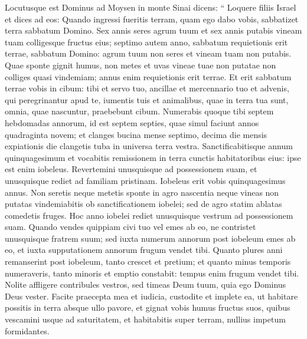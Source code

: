 \begin{biblechapter}
\begin{biblechapter}
\begin{biblechapter}
\begin{biblechapter}
\begin{biblechapter}
\begin{biblechapter}
\begin{biblechapter}
\begin{biblechapter}
\begin{biblechapter}
\begin{biblechapter}
\begin{biblechapter}
\begin{biblechapter}
\begin{biblechapter}
\begin{biblechapter}
\begin{biblechapter}
\begin{biblechapter}
\begin{biblechapter}
\begin{biblechapter}
\begin{biblechapter}
\begin{biblechapter}
\begin{biblechapter}
\begin{biblechapter}
\begin{biblechapter}
\begin{biblechapter}
\begin{biblechapter}
\verse Locutusque est Dominus ad Moysen in monte Sinai dicens: 
\verse “ Loquere filiis Israel et dices ad eos: Quando ingressi fueritis terram, quam ego dabo vobis, sabbatizet terra sabbatum Domino. 
\verse Sex annis seres agrum tuum et sex annis putabis vineam tuam colligesque fructus eius; 
\verse septimo autem anno, sabbatum requietionis erit terrae, sabbatum Domino: agrum tuum non seres et vineam tuam non putabis. 
\verse Quae sponte gignit humus, non metes et uvas vineae tuae non putatae non colliges quasi vindemiam; annus enim requietionis erit terrae. 
\verse Et erit sabbatum terrae vobis in cibum: tibi et servo tuo, ancillae et mercennario tuo et advenis, qui peregrinantur apud te, 
\verse iumentis tuis et animalibus, quae in terra tua sunt, omnia, quae nascuntur, praebebunt cibum.
 \verse Numerabis quoque tibi septem hebdomadas annorum, id est septem septies, quae simul faciunt annos quadraginta novem; 
\verse et clanges bucina mense septimo, decima die mensis expiationis die clangetis tuba in universa terra vestra. 
 \verse Sanctificabitisque annum quinquagesimum et vocabitis remissionem in terra cunctis habitatoribus eius: ipse est enim iobeleus. Revertemini unusquisque ad possessionem suam, et unusquisque rediet ad familiam pristinam.
 \verse Iobeleus erit vobis quinquagesimus annus. Non seretis neque metetis sponte in agro nascentia neque vineas non putatas vindemiabitis 
\verse ob sanctificationem iobelei; sed de agro statim ablatas comedetis fruges. 
\verse Hoc anno iobelei rediet unusquisque vestrum ad possessionem suam.
 \verse Quando vendes quippiam civi tuo vel emes ab eo, ne contristet unusquisque fratrem suum; sed iuxta numerum annorum post iobeleum emes ab eo, 
\verse et iuxta supputationem annorum frugum vendet tibi. 
\verse Quanto plures anni remanserint post iobeleum, tanto crescet et pretium; et quanto minus temporis numeraveris, tanto minoris et emptio constabit: tempus enim frugum vendet tibi. 
 \verse Nolite affligere contribules vestros, sed timeas Deum tuum, quia ego Dominus Deus vester.
 \verse Facite praecepta mea et iudicia, custodite et implete ea, ut habitare possitis in terra absque ullo pavore, 
\verse et gignat vobis humus fructus suos, quibus vescamini usque ad saturitatem, et habitabitis super terram, nullius impetum formidantes.

\end{biblechapter}
\end{biblechapter}
\end{biblechapter}
\end{biblechapter}
\end{biblechapter}
\end{biblechapter}
\end{biblechapter}
\end{biblechapter}
\end{biblechapter}
\end{biblechapter}
\end{biblechapter}
\end{biblechapter}
\end{biblechapter}
\end{biblechapter}
\end{biblechapter}
\end{biblechapter}
\end{biblechapter}
\end{biblechapter}
\end{biblechapter}
\end{biblechapter}
\end{biblechapter}
\end{biblechapter}
\end{biblechapter}
\end{biblechapter}
\end{biblechapter}
